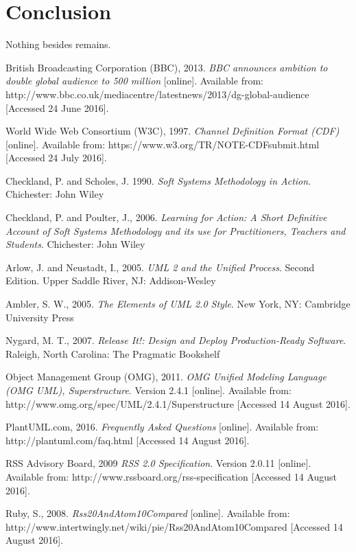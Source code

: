 \documentclass{article}
\begin{document}
\section{Conclusion}
Nothing besides remains.

\begin{thebibliography}{9}

British Broadcasting Corporation (BBC), 2013.
\textit{BBC announces ambition to double global audience to 500 million} [online].
Available from: http://www.bbc.co.uk/mediacentre/latestnews/2013/dg-global-audience [Accessed 24 June 2016].

World Wide Web Consortium (W3C), 1997.
\textit{Channel Definition Format (CDF)} [online].
Available from: https://www.w3.org/TR/NOTE-CDFsubmit.html
[Accessed 24 July 2016].

Checkland, P. and Scholes, J. 1990.
\textit{Soft Systems Methodology in Action}.
Chichester: John Wiley

Checkland, P. and Poulter, J., 2006.
\textit{Learning for Action: A Short Definitive Account of Soft Systems Methodology and its use for Practitioners, Teachers and Students}.
Chichester: John Wiley

Arlow, J. and Neustadt, I., 2005.
\textit{UML 2 and the Unified Process}. Second Edition.
Upper Saddle River, NJ: Addison-Wesley

Ambler, S. W., 2005.
\textit{The Elements of UML 2.0 Style}.
New York, NY: Cambridge University Press

Nygard, M. T., 2007.
\textit{Release It!: Design and Deploy Production-Ready Software}.
Raleigh, North Carolina: The Pragmatic Bookshelf

Object Management Group (OMG), 2011.
\textit{OMG Unified Modeling Language (OMG UML), Superstructure}. Version 2.4.1 [online].
Available from: http://www.omg.org/spec/UML/2.4.1/Superstructure
[Accessed 14 August 2016].

PlantUML.com, 2016.
\textit{Frequently Asked Questions} [online].
Available from: http://plantuml.com/faq.html
[Accessed 14 August 2016].

RSS Advisory Board, 2009
\textit{RSS 2.0 Specification}. Version 2.0.11 [online].
Available from: http://www.rssboard.org/rss-specification
[Accessed 14 August 2016].

Ruby, S., 2008.
\textit{Rss20AndAtom10Compared} [online].
Available from: http://www.intertwingly.net/wiki/pie/Rss20AndAtom10Compared
[Accessed 14 August 2016].

\end{thebibliography}
\end{document}
